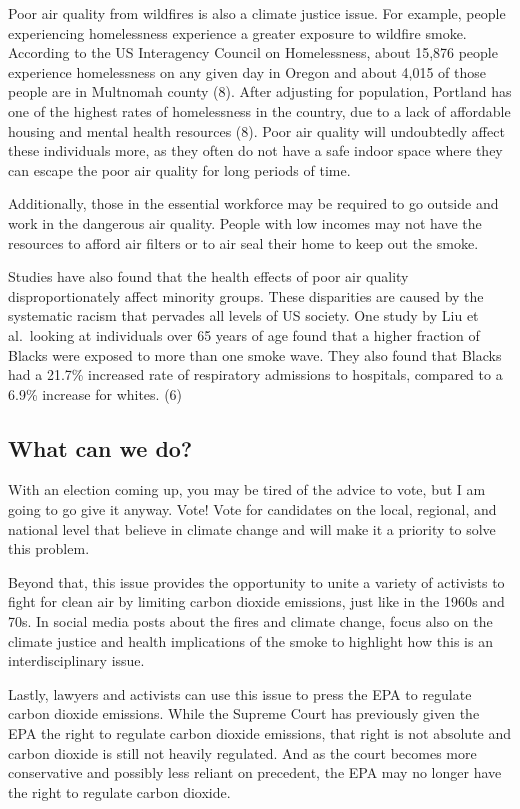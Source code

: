 \documentclass[]{article}
\begin{document}
Poor air quality from wildfires is also a climate justice issue. For
example, people experiencing homelessness experience a greater exposure
to wildfire smoke. According to the US Interagency Council on
Homelessness, about 15,876 people experience homelessness on any given
day in Oregon and about 4,015 of those people are in Multnomah county
(8). After adjusting for population, Portland has one of the highest
rates of homelessness in the country, due to a lack of affordable
housing and mental health resources (8). Poor air quality will
undoubtedly affect these individuals more, as they often do not have a
safe indoor space where they can escape the poor air quality for long
periods of time.

Additionally, those in the essential workforce may be required to go
outside and work in the dangerous air quality. People with low incomes
may not have the resources to afford air filters or to air seal their
home to keep out the smoke.

Studies have also found that the health effects of poor air quality
disproportionately affect minority groups. These disparities are caused
by the systematic racism that pervades all levels of US society. One
study by Liu et al.~looking at individuals over 65 years of age found
that a higher fraction of Blacks were exposed to more than one smoke
wave. They also found that Blacks had a 21.7\% increased rate of
respiratory admissions to hospitals, compared to a 6.9\% increase for
whites. (6)

\hypertarget{what-can-we-do}{%
\subsection{What can we do?}\label{what-can-we-do}}

With an election coming up, you may be tired of the advice to vote, but
I am going to go give it anyway. Vote! Vote for candidates on the local,
regional, and national level that believe in climate change and will
make it a priority to solve this problem.

Beyond that, this issue provides the opportunity to unite a variety of
activists to fight for clean air by limiting carbon dioxide emissions,
just like in the 1960s and 70s. In social media posts about the fires
and climate change, focus also on the climate justice and health
implications of the smoke to highlight how this is an interdisciplinary
issue.

Lastly, lawyers and activists can use this issue to press the EPA to
regulate carbon dioxide emissions. While the Supreme Court has
previously given the EPA the right to regulate carbon dioxide emissions,
that right is not absolute and carbon dioxide is still not heavily
regulated. And as the court becomes more conservative and possibly less
reliant on precedent, the EPA may no longer have the right to regulate
carbon dioxide.
\end{document}
